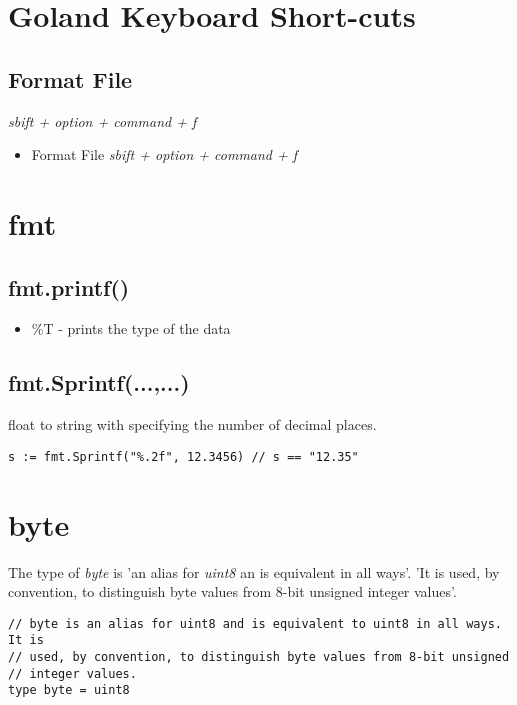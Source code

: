 \documentclass[]{article}
\renewcommand{\it}[1]{\textit{#1}}
\begin{document}
\section{Goland Keyboard Short-cuts}
\subsection{Format File}
\it{sbift + option + command + f}
\begin{itemize}
	\item Format File
	\subitem \it{sbift + option + command + f}
\end{itemize}

\section{fmt}
\subsection{fmt.printf()}
\begin{itemize}
	\item \%T - prints the type of the data 
\end{itemize}

\subsection{fmt.Sprintf(...,...)}
float to string with specifying the number of decimal places.
\begin{lstlisting}
s := fmt.Sprintf("%.2f", 12.3456) // s == "12.35"
\end{lstlisting}

\section{byte}
The type of \it{byte} is 'an alias for \it{uint8} an is equivalent in all ways'. 'It is used, by convention, to distinguish byte values from 8-bit unsigned integer values'.
\begin{lstlisting}
// byte is an alias for uint8 and is equivalent to uint8 in all ways. It is
// used, by convention, to distinguish byte values from 8-bit unsigned
// integer values.
type byte = uint8
\end{lstlisting}\cite{byte-definition}
\end{document}
